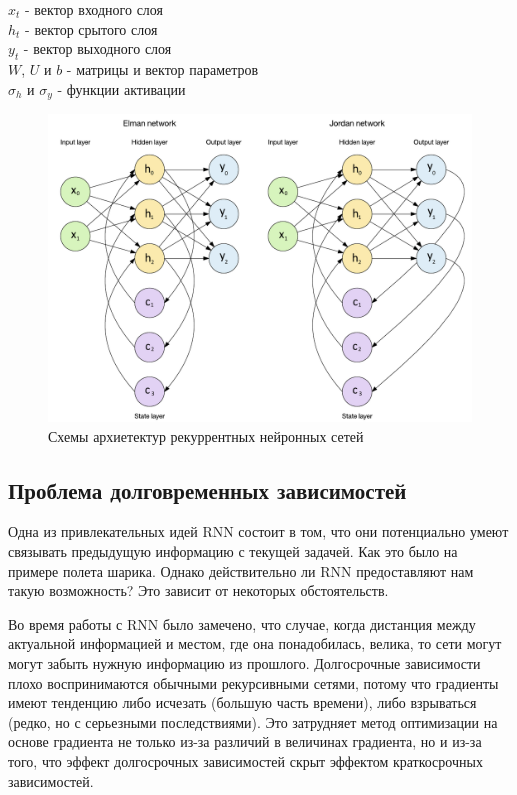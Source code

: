 	\begin{tabbing}
		$x_t$ - вектор входного слоя        \\
		$h_t$ - вектор срытого слоя         \\
		$y_t$ - вектор выходного слоя       \\
		$W$, $U$ и $b$ - матрицы и вектор параметров       \\
		$\sigma_h$ и $\sigma_y$ - функции активации
	\end{tabbing}
	
	\begin{figure}[ht!]
		\centering
		\captionsetup{justification=centering}
		\includegraphics[width=140mm]{img/RNN.png}
		\caption{Схемы архиетектур рекуррентных нейронных сетей}
	\end{figure}
	
	\subsection{Проблема долговременных зависимостей}
	
	Одна из привлекательных идей RNN состоит в том, что они потенциально умеют связывать предыдущую информацию с текущей задачей. Как это было на примере полета шарика. Однако действительно ли RNN предоставляют нам такую возможность? Это зависит от некоторых обстоятельств.

	Во время работы с RNN было замечено, что случае, когда дистанция между актуальной информацией и местом, где она понадобилась, велика, то сети могут могут забыть нужную информацию из прошлого. Долгосрочные зависимости плохо воспринимаются обычными рекурсивными сетями, потому что градиенты имеют тенденцию либо исчезать (большую часть времени), либо взрываться (редко, но с серьезными последствиями). Это затрудняет метод оптимизации на основе градиента не только из-за различий в величинах градиента, но и из-за того, что эффект долгосрочных зависимостей скрыт эффектом краткосрочных зависимостей. 
	
